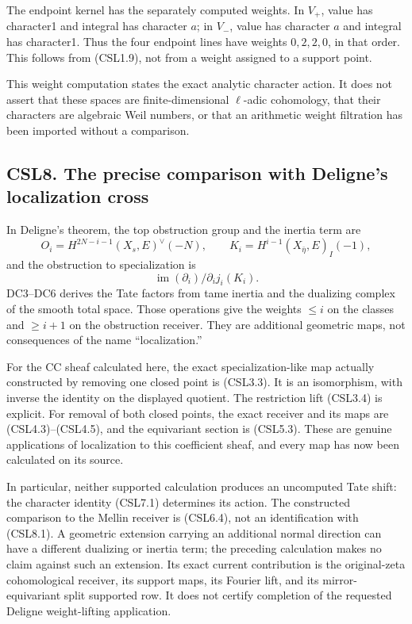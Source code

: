 The endpoint kernel has the separately computed weights. In \(V_+\),
value has character1 and integral has character \(a\); in \(V_-\), value
has character \(a\) and integral has character1. Thus the four endpoint
lines have weights \(0,2,2,0\), in that order. This follows from
(CSL1.9), not from a weight assigned to a support point.

This weight computation states the exact analytic character action. It
does not assert that these spaces are finite-dimensional \(\ell\)-adic
cohomology, that their characters are algebraic Weil numbers, or that an
arithmetic weight filtration has been imported without a comparison.

\subsection{CSL8. The precise comparison with Deligne's localization
cross}\label{csl8.-the-precise-comparison-with-delignes-localization-cross}

In Deligne's theorem, the top obstruction group and the inertia term are
\[
O_i=H^{2N-i-1}(X_s,E)^\vee(-N),\qquad
K_i=H^{i-1}(X_{\bar\eta},E)_I(-1),
\tag{CSL8.1}
\] and the obstruction to specialization is \[
\operatorname{im}(\partial_i)/\partial_i j_i(K_i).
\tag{CSL8.2}
\] DC3--DC6 derives the Tate factors from tame inertia and the dualizing
complex of the smooth total space. Those operations give the weights
\(\le i\) on the classes and \(\ge i+1\) on the obstruction receiver.
They are additional geometric maps, not consequences of the name
``localization.''

For the CC sheaf calculated here, the exact specialization-like map
actually constructed by removing one closed point is (CSL3.3). It is an
isomorphism, with inverse the identity on the displayed quotient. The
restriction lift (CSL3.4) is explicit. For removal of both closed
points, the exact receiver and its maps are (CSL4.3)--(CSL4.5), and the
equivariant section is (CSL5.3). These are genuine applications of
localization to this coefficient sheaf, and every map has now been
calculated on its source.

In particular, neither supported calculation produces an uncomputed Tate
shift: the character identity (CSL7.1) determines its action. The
constructed comparison to the Mellin receiver is (CSL6.4), not an
identification with (CSL8.1). A geometric extension carrying an
additional normal direction can have a different dualizing or inertia
term; the preceding calculation makes no claim against such an
extension. Its exact current contribution is the original-zeta
cohomological receiver, its support maps, its Fourier lift, and its
mirror-equivariant split supported row. It does not certify completion
of the requested Deligne weight-lifting application.

